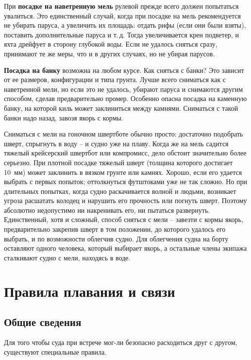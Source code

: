 \documentclass[a4paper, 12pt, twoside, final]{scrbook}
\begin{document}
При \textbf{посадке на наветренную мель} рулевой прежде всего должен попытаться увалиться. Это единственный случай, когда при посадке на мель рекомендуется не убирать паруса, а увеличить их площадь: отдать рифы (если они были взяты), поставить дополнительные паруса и т.\,д. Тогда увеличивается крен подветер, и яхта дрейфует в сторону глубокой воды. Если не удалось сняться сразу, принимают те же меры, что и в других случаях, но не убирая парусов. 

\textbf{Посадка на банку} возможна на любом курсе. Как сняться с банки? Это зависит от ее размеров, конфигурации и типа грунта. Лучше всего сниматься как с наветренной мели, но если это не удалось, убирают паруса и снимаются другим способом, сделав предварительно промер. Особенно опасна посадка на каменную банку, на которой киль может заклиниться между камнями. Сниматься с такой банки надо назад, завозя якорь с кормы.

Сниматься с мели на гоночном швертботе обычно просто: достаточно подобрать шверт, спрыгнуть в воду \--- и судно уже на плаву. Когда же на мель садится тяжелый крейсерский швертбот или компромисс, дело обстоит значительно более серьезно. При плотной посадке тяжелый шверт (толщина которого достигает 10~мм) может заклинить в вязком грунте или камнях. Хорошо, если его удается выбрать с первых попыток; оттолкнуться футштоками уже не так сложно. Но при длительных попытках, когда судно раскачивается волной и людьми, возникает угроза расшатать колодец и нарушить его прочность или погнуть шверт. Поэтому абсолютно недопустимо ни накренивать его, ни пытаться развернуть. Единственный, хотя и сложный, способ сняться с мели \--- завезти с кормы якорь, предварительно закрепив шверт в том положении, до которого удалось его выбрать, и по возможности облегчив судно. Для облегчения судна на борту оставляют одного человека, который выбирает якорь, а остальные члены экипажа сталкивают судно с мели, находясь в воде.

\chapter{Правила плавания и связи}

\section{Общие сведения}

Для того чтобы суда при встрече мог-ли безопасно расходиться друг с другом, существуют специальные правила.
\end{document}
